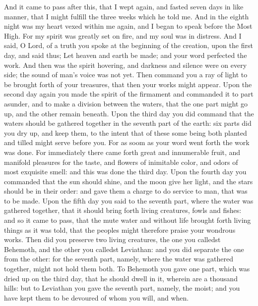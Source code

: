 {\par }{\PP {}And it came to pass after this, that I wept again, and fasted seven days in like manner, that I might fulfill the three weeks which he told me.
And in the eighth night was my heart vexed within me again, and I began to speak before the Most High.
For my spirit was greatly set on fire, and my soul was in distress.
And I said, O Lord, of a truth you spoke at the beginning of the creation, upon the first day, and said thus; Let heaven and earth be made; and your word perfected the work.
And then was the spirit hovering, and darkness and silence were on every side; the sound of man’s voice was not yet.
Then command you a ray of light to be brought forth of your treasures, that then your works might appear.
Upon the second day again you made the spirit of the firmament and commanded it to part asunder, and to make a division between the waters, that the one part might go up, and the other remain beneath.
Upon the third day you did command that the waters should be gathered together in the seventh part of the earth: six parts did you dry up, and keep them, to the intent that of these some being both planted and tilled might serve before you.
For as soom as your word went forth the work was done.
For immediately there came forth great and innumerable fruit, and manifold pleasures for the taste, and flowers of inimitable color, and odors of most exquisite smell: and this was done the third day.
Upon the fourth day you commanded that the sun should shine, and the moon give her light, and the stars should be in their order:
and gave them a charge to do service to man, that was to be made.
Upon the fifth day you said to the seventh part, where the water was gathered together, that it should bring forth living creatures, fowls and fishes: and so it came to pass,
that the mute water and without life brought forth living things as it was told, that the peoples might therefore praise your wondrous works.
Then did you preserve two living creatures, the one you calledst Behemoth, and the other you calledst Leviathan:
and you did separate the one from the other: for the seventh part, namely, where the water was gathered together, might not hold them both.
To Behemoth you gave one part, which was dried up on the third day, that he should dwell in it, wherein are a thousand hills:
but to Leviathan you gave the seventh part, namely, the moist; and you have kept them to be devoured of whom you will, and when.
}
